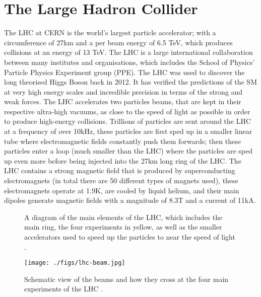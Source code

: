 \documentclass[a4paper]{article}
\theoremstyle{plain}
\theoremstyle{definition}
\begin{document}
	

	\section{The Large Hadron Collider}
	\label{sec:lhc}

	The LHC \cite{lhc} at CERN is the world's largest particle accelerator; with a circumference of 27km and a per beam energy of 6.5 TeV, which produces collisions at an energy of 13 TeV. The LHC is a large international collaboration between many institutes and organisations, which includes the School of Physics' Particle Physics Experiment group (PPE). The LHC was used to discover the long theorised Higgs Boson back in 2012. It has verified the predictions of the SM at very high energy scales and incredible precision in terms of the strong and weak forces.  The LHC accelerates two particles beams, that are kept in their respective ultra-high vacuums, as close to the speed of light as possible in order to produce high-energy collisions. Trillions of particles are sent around the LHC at a frequency of over 10kHz, these particles are first sped up in a smaller linear tube where electromagnetic fields constantly push them forwards; then these particles enter a loop (much smaller than the LHC) where the particles are sped up even more before being injected into the 27km long ring of the LHC. The LHC contains a strong magnetic field that is produced by superconducting electromagnets (in total there are 50 different types of magnets used), these electromagnets operate at 1.9K, are cooled by liquid helium, and their main dipoles generate magnetic fields with a magnitude of 8.3T and a current of 11kA.

	
	\begin{figure}[htbp]
	\centering
		\begin{minipage}[b]{0.45\linewidth}
			\centering
			
			\caption{A diagram of the main elements of the LHC, which includes the main ring, the four experiments in yellow, as well as the smaller accelerators used to speed up the particles to near the speed of light \cite{lhc-diagram}. }
			\label{fig:lhc}
		\end{minipage}
	\hfill
		\begin{minipage}[b]{0.45\linewidth}
			\centering
			\texttt{[image: ./figs/lhc-beam.jpg]}
			\caption{Schematic view of the beams and how they cross at the four main experiments of the LHC \cite{lhc}.}
			\label{fig:lhc-beams}
		\end{minipage}
    \end{figure}
\end{document}
